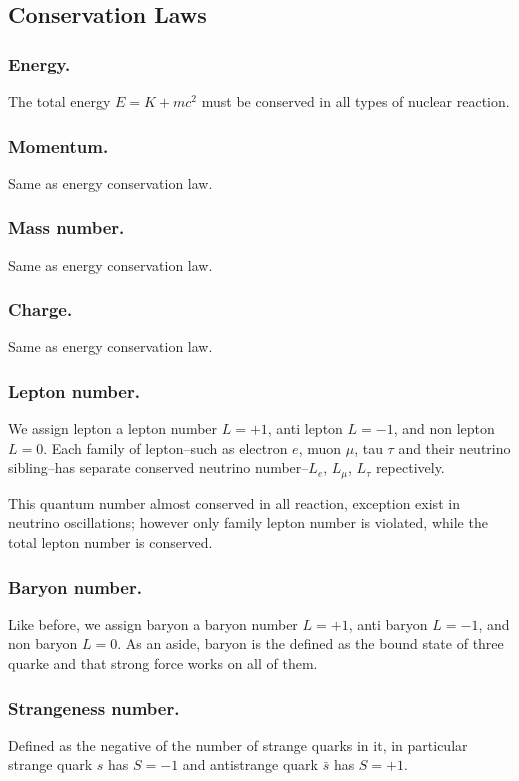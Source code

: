 \documentclass[../../../main.tex]{subfiles}
\begin{document}
\subsection{Conservation Laws}
\subsubsection{Energy.} The total energy $E=K+mc^2$ must be conserved in all types of nuclear reaction.

\subsubsection{Momentum.} Same as energy conservation law.

\subsubsection{Mass number.} Same as energy conservation law.

\subsubsection{Charge.} Same as energy conservation law.

\subsubsection{Lepton number.} We assign lepton a lepton number $L=+1$, anti lepton $L=-1$, and non lepton $L=0$. Each family of lepton--such as electron $e$, muon $\mu$, tau $\tau$ and their neutrino sibling--has separate conserved neutrino number--$L_e$, $L_\mu$, $L_\tau$ repectively.

This quantum number almost conserved in all reaction, exception exist in neutrino oscillations; however only family lepton number is violated, while the total lepton number is conserved.

\subsubsection{Baryon number.} Like before, we assign baryon a baryon number $L=+1$, anti baryon $L=-1$, and non baryon $L=0$. As an aside, baryon is the defined as the bound state of three quarke and that strong force works on all of them.

\subsubsection{Strangeness number.} Defined as the negative of the number of strange quarks in it, in particular strange quark $s$ has $S=-1$ and antistrange quark $\bar{s}$ has $S=+1$.
\end{document}

